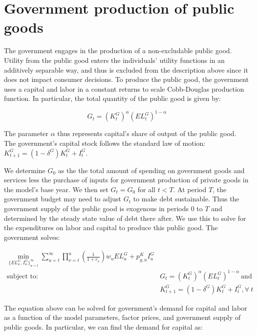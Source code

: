 \section{Government production of public goods}

The government engages in the production of a non-excludable public good.  Utility from the public good enters the individuals' utility functions in an additively separable way, and thus is excluded from the description above since it does not impact consumer decisions.  To produce the public good, the government uses a capital and labor in a constant returns to scale Cobb-Douglas production function.  In particular, the total quantity of the public good is given by:

\begin{equation}
\label{eqn:pub_good}
G_{t} = (K^{G}_{t})^{\alpha}(EL^{G}_{t})^{1-\alpha}
\end{equation}

\noindent\noindent The parameter $\alpha$ thus represents capital's share of output of the public good.  The government's capital stock follows the standard law of motion: $K^{G}_{t+1} = (1-\delta^{G})K^{G}_{t} + I^{G}_{t}$.  

We determine $G_{0}$ as the the total amount of spending on government goods and services less the purchase of inputs for government production of private goods in the model's base year.  We then set $G_{t}=G_{0}$ for all $t<T$.  At period $T$, the government budget may need to adjust $G_{t}$ to make debt sustainable.  Thus the government supply of the public good is exogenous in periods 0 to $T$ and determined by the steady state value of debt there after.  We use this to solve for the expenditures on labor and capital to produce this public good.  The government solves:

\begin{align}
\min_{\{EL^{G}_{u},I^{G}_{u}\}^{\infty}_{u=t}} \sum_{u=t}^{\infty} \prod_{\nu=t}^{u}\left(\frac{1}{1+r_{\nu}}\right) w_{u}EL^{G}_{u} + p^{K}_{g,u}I^{G}_{u} & \\
\text{subject to:} \ & G_{t} = (K^{G}_{t})^{\alpha}(EL^{G}_{t})^{1-\alpha} \ \text{and} \\
	& K^{G}_{t+1} = (1-\delta^{G})K^{G}_{t} + I^{G}_{t}, \forall  \ t
\end{align}

The equation above can be solved for government's demand for capital and labor as a function of the model parameters, factor prices, and government supply of public goods.  In particular, we can find the demand for capital as:

